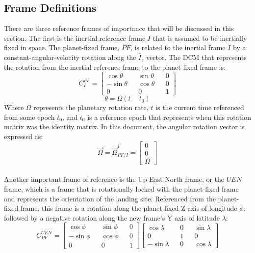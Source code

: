 \subsection{Frame Definitions}
There are three reference frames of importance that will be discussed in this section. The first is the inertial reference frame $I$ that is assumed to be inertially fixed in space. The planet-fixed frame, $PF$, is related to the inertial frame $I$ by a constant-angular-velocity rotation along the $\hat{I}_z$ vector. The DCM that represents the rotation from the inertial reference frame to the planet fixed frame is:
\begin{equation}
C_{I}^{PF} = \begin{bmatrix}
\cos{\theta} && \sin{\theta} && 0 \\
-\sin{\theta} && \cos{\theta} && 0 \\
0 && 0 && 1
\end{bmatrix}
\end{equation}
\begin{equation}
\theta = \Omega(t - t_0)
\end{equation}
Where $\Omega$ represents the planetary rotation rate, $t$ is the current time referenced from some epoch $t_0$, and $t_0$ is a reference epoch that represents when this rotation matrix was the identity matrix. In this document, the angular rotation vector is expressed as:
\begin{equation}
\vec{\Omega} = \vec{\Omega}_{PF/I}^{I} = \begin{bmatrix}
0 \\ 0 \\ \Omega
\end{bmatrix}
\end{equation}
\paragraph{}
Another important frame of reference is the Up-East-North frame, or the $\mathit{UEN}$ frame, which is a frame that is rotationally locked with the planet-fixed frame and represents the orientation of the landing site. Referenced from the planet-fixed frame, this frame is a rotation along the planet-fixed Z axis of longitude $\phi$, followed by a negative rotation along the new frame's Y axis of latitude $\lambda$:
\begin{equation}
C_{PF}^{UEN} = \begin{bmatrix}
\cos{\phi} && \sin{\phi} && 0 \\
-\sin{\phi} && \cos{\phi} && 0 \\
0 && 0 && 1
\end{bmatrix}
\begin{bmatrix}
\cos{\lambda} && 0 && \sin{\lambda} \\
0 && 1 && 0 \\
-\sin{\lambda} && 0 && \cos{\lambda}
\end{bmatrix}
\end{equation}
